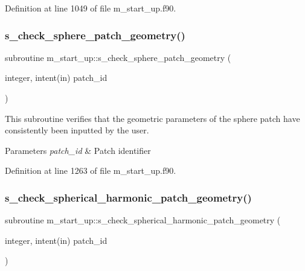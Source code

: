 Definition at line 1049 of file m\+\_\+start\+\_\+up.\+f90.

\mbox{\label{namespacem__start__up_a3bc334d434726c8cdba2f5d611ec4d42}} 
\subsubsection{\texorpdfstring{s\+\_\+check\+\_\+sphere\+\_\+patch\+\_\+geometry()}{s\_check\_sphere\_patch\_geometry()}}
{\footnotesize\ttfamily subroutine m\+\_\+start\+\_\+up\+::s\+\_\+check\+\_\+sphere\+\_\+patch\+\_\+geometry (\begin{DoxyParamCaption}\item[{integer, intent(in)}]{patch\+\_\+id }\end{DoxyParamCaption})}



This subroutine verifies that the geometric parameters of the sphere patch have consistently been inputted by the user. 


\begin{DoxyParams}{Parameters}
{\em patch\+\_\+id} & Patch identifier \\
\hline
\end{DoxyParams}


Definition at line 1263 of file m\+\_\+start\+\_\+up.\+f90.

\mbox{\label{namespacem__start__up_a59bfdd1a0d03041d57f7f9e7e1a38a97}} 
\subsubsection{\texorpdfstring{s\+\_\+check\+\_\+spherical\+\_\+harmonic\+\_\+patch\+\_\+geometry()}{s\_check\_spherical\_harmonic\_patch\_geometry()}}
{\footnotesize\ttfamily subroutine m\+\_\+start\+\_\+up\+::s\+\_\+check\+\_\+spherical\+\_\+harmonic\+\_\+patch\+\_\+geometry (\begin{DoxyParamCaption}\item[{integer, intent(in)}]{patch\+\_\+id }\end{DoxyParamCaption})}



